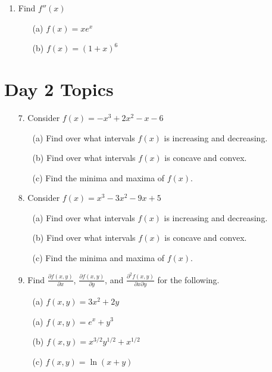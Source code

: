 \documentclass[11pt]{article}
\begin{document}
\begin{enumerate}
\item Find \( f''(x) \)

\begin{itemize}
    \item[(a)] \( f(x) = xe^{x} \)
    \item[(b)] \( f(x) = (1 + x)^{6} \)
\end{itemize}

\end{enumerate}

\newpage
\section*{Day 2 Topics}

\begin{enumerate} 

\item[7.] Consider \( f(x) = -x^3 + 2x^2 - x - 6 \)

\begin{itemize}
    \item[(a)] Find over what intervals \( f(x) \) is increasing and decreasing.
    \item[(b)] Find over what intervals \( f(x) \) is concave and convex.
    \item[(c)] Find the minima and maxima of \( f(x) \).
\end{itemize}

\item[8.] Consider \( f(x) = x^3 - 3x^2 - 9x + 5 \)

\begin{itemize}
    \item[(a)] Find over what intervals \( f(x) \) is increasing and decreasing.
    \item[(b)] Find over what intervals \( f(x) \) is concave and convex.
    \item[(c)] Find the minima and maxima of \( f(x) \).
\end{itemize}
   
\item[9.] Find \( \frac{\partial f(x, y)}{\partial x} \), \( \frac{\partial f(x, y)}{\partial y} \), and \( \frac{\partial^2 f(x, y)}{\partial x \partial y} \) for the following.

\begin{itemize}
	\item[(a)] \( f(x, y) = 3x^2 + 2y \)
    \item[(a)] \( f(x, y) = e^x + y^3 \)
    \item[(b)] \( f(x, y) = x^{3/2}y^{1/2} + x^{1/2} \)
    \item[(c)] \( f(x, y) = \ln(x + y) \)
\end{itemize}


\end{enumerate}
\end{document}
